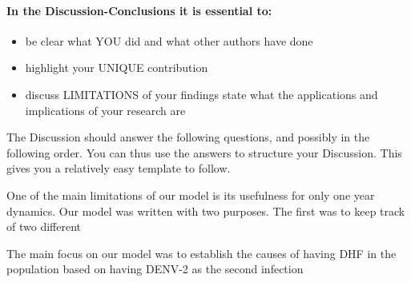 \paragraph{In the Discussion-Conclusions it is essential to:}

\begin{itemize}
    \item
        be clear what YOU did and what other authors have done
    \item
        highlight your UNIQUE contribution
    
    \item
        discuss LIMITATIONS of your findings state what the
         applications and implications of your research are
\end{itemize}

The Discussion should answer the following questions, and possibly in the following order. 
You can thus use the answers to structure your Discussion. This gives you
a relatively easy template to follow.


\noindent One of the main limitations of our model is its usefulness for only one year dynamics. 
Our model was written with two purposes. The first was to keep track of two different 

The main focus on our model was to establish the causes of having DHF in the population based on
having DENV-2 as the second infection 

